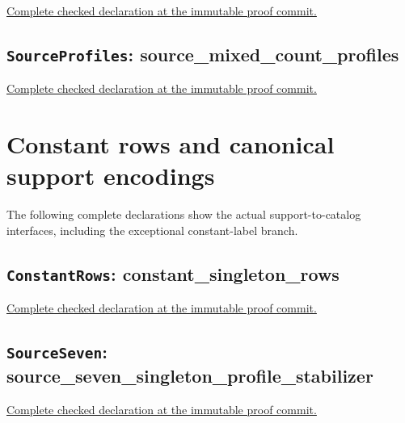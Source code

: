 \noindent\href{https://github.com/alectionary/vibe-math/blob/3ae21c0719cedbd928f4f7882f9b9e266567605e/formalization/distance-preservation/truncated12/ActualIncidence.lean#L127-L144}{Complete checked declaration at the immutable proof commit.}



\subsection*{\texttt{SourceProfiles}: source\_mixed\_count\_profiles}

\noindent\href{https://github.com/alectionary/vibe-math/blob/3ae21c0719cedbd928f4f7882f9b9e266567605e/formalization/distance-preservation/truncated12/SourceProfiles.lean#L29-L79}{Complete checked declaration at the immutable proof commit.}



\clearpage\section{Constant rows and canonical support encodings}

The following complete declarations show the actual support-to-catalog interfaces, including the exceptional constant-label branch.

\subsection*{\texttt{ConstantRows}: constant\_singleton\_rows}

\noindent\href{https://github.com/alectionary/vibe-math/blob/3ae21c0719cedbd928f4f7882f9b9e266567605e/formalization/distance-preservation/truncated12/ConstantRows.lean#L25-L43}{Complete checked declaration at the immutable proof commit.}



\subsection*{\texttt{SourceSeven}: source\_seven\_singleton\_profile\_stabilizer}

\noindent\href{https://github.com/alectionary/vibe-math/blob/3ae21c0719cedbd928f4f7882f9b9e266567605e/formalization/distance-preservation/truncated12/SourceSeven.lean#L258-L281}{Complete checked declaration at the immutable proof commit.}

